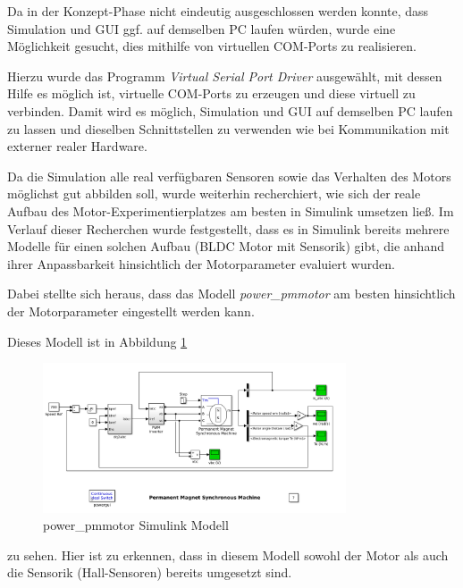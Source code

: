 Da in der Konzept-Phase nicht eindeutig ausgeschlossen werden konnte, dass Simulation und GUI ggf. auf demselben PC laufen würden, wurde eine Möglichkeit gesucht, dies mithilfe von virtuellen COM-Ports zu realisieren. 

Hierzu wurde das Programm \textit{Virtual Serial Port Driver} %
ausgewählt, mit dessen Hilfe es möglich ist, virtuelle COM-Ports zu erzeugen und diese virtuell zu verbinden. Damit wird es möglich, Simulation und GUI auf demselben PC laufen zu lassen und dieselben Schnittstellen zu verwenden wie bei Kommunikation mit externer realer Hardware.

Da die Simulation alle real verfügbaren Sensoren sowie das Verhalten des Motors möglichst gut abbilden soll, wurde weiterhin recherchiert, wie sich der reale Aufbau des Motor-Experimentierplatzes am besten in Simulink umsetzen ließ. Im Verlauf dieser Recherchen wurde festgestellt, dass es in Simulink bereits mehrere Modelle für einen solchen Aufbau (BLDC Motor mit Sensorik) gibt, die anhand ihrer Anpassbarkeit hinsichtlich der Motorparameter evaluiert wurden. 

Dabei stellte sich heraus, dass das Modell \textit{power\_pmmotor}
am besten hinsichtlich der Motorparameter eingestellt werden kann. 

Dieses Modell ist in Abbildung \ref{FigPowerPmmotor}
\begin{figure}[htbp]
	\centering
	\includegraphics[width=0.8\textwidth]{./sim/pictures/powerPmmotor.png}
	\caption{power\_pmmotor Simulink Modell}
	\label{FigPowerPmmotor}
\end{figure}

zu sehen. Hier ist zu erkennen, dass in diesem Modell sowohl der Motor als auch die Sensorik (Hall-Sensoren) bereits umgesetzt sind. 


